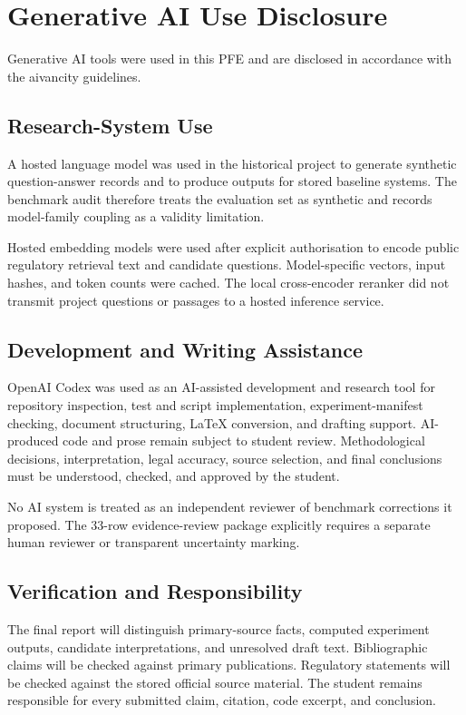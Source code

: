 \chapter{Generative AI Use Disclosure}
\label{app:ai-disclosure}

Generative AI tools were used in this PFE and are disclosed in accordance with the aivancity guidelines.

\section{Research-System Use}

A hosted language model was used in the historical project to generate synthetic question-answer records and to produce outputs for stored baseline systems. The benchmark audit therefore treats the evaluation set as synthetic and records model-family coupling as a validity limitation.

Hosted embedding models were used after explicit authorisation to encode public regulatory retrieval text and candidate questions. Model-specific vectors, input hashes, and token counts were cached. The local cross-encoder reranker did not transmit project questions or passages to a hosted inference service.

\section{Development and Writing Assistance}

OpenAI Codex was used as an AI-assisted development and research tool for repository inspection, test and script implementation, experiment-manifest checking, document structuring, LaTeX conversion, and drafting support. AI-produced code and prose remain subject to student review. Methodological decisions, interpretation, legal accuracy, source selection, and final conclusions must be understood, checked, and approved by the student.

No AI system is treated as an independent reviewer of benchmark corrections it proposed. The 33-row evidence-review package explicitly requires a separate human reviewer or transparent uncertainty marking.

\section{Verification and Responsibility}

The final report will distinguish primary-source facts, computed experiment outputs, candidate interpretations, and unresolved draft text. Bibliographic claims will be checked against primary publications. Regulatory statements will be checked against the stored official source material. The student remains responsible for every submitted claim, citation, code excerpt, and conclusion.


